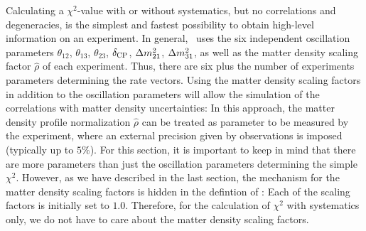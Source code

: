 Calculating a $\chi^2$-value with or without systematics, but no correlations and degeneracies, is the simplest and fastest possibility to obtain high-level information on an experiment. In general, \GLOBES\ uses the six independent oscillation parameters $\theta_{12}$, $\theta_{13}$, $\theta_{23}$, $\delta_{\mathrm{CP}}$, $\Delta m_{21}^2$, $\Delta m_{31}^2$, as well as the matter density 
scaling factor $\hat{\rho}$ of each experiment. Thus, there are six plus the number of experiments parameters determining the rate vectors. Using the matter density scaling factors  in addition to the oscillation parameters will allow the simulation of the correlations with matter density uncertainties: In this
approach, the matter density profile normalization $\hat{\rho}$ can 
be treated
as parameter to be measured by the experiment, where an external precision
given by observations is imposed (typically up to $5\%$). 
 For this section, it is important to keep in mind
that there are more parameters than just the oscillation parameters
determining the simple $\chi^2$. However, as we have described in the
last section, the mechanism for the matter density scaling factors
is hidden in the defintion of : Each of the scaling
factors is initially set to $1.0$. Therefore, for the calculation of
$\chi^2$ with systematics only, we do not have to care about the
matter density scaling factors.

